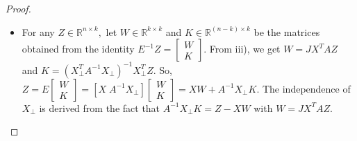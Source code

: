 \documentclass[10pt,a4paper]{amsart}
\def\Rbkk{{\mathbb{R}^{k\times k}}}
\def\Rbnk{{\mathbb{R}^{n\times k}}}
\begin{document}
\begin{proof}
\begin{itemize}
					\item[iv)] For any $Z\in\Rbnk,$ let $W\in\Rbkk$ and $K\in\mathbb{R}^{(n-k)\times k}$ be the matrices obtained from the identity $E^{-1}Z =  \left[\begin{smallmatrix}
						W\\ 
						K
					\end{smallmatrix}\right].$ From iii), we get $W = JX^{T}AZ$ and $ K = (X_{\perp}^{T}A^{-1}X_{\perp})^{-1}X_{\perp}^{T}Z.$ %
					So,
					$Z = E  \left[\begin{smallmatrix}
						W\\ 
						K
					\end{smallmatrix}\right] = [X\; A^{-1}X_{\perp}] \left[\begin{smallmatrix}
						W\\ 
						K
					\end{smallmatrix}\right] = XW +  A^{-1}X_{\perp}K.$ 
					The independence of $X_{\perp}$  %
						is derived from the fact %
						that $A^{-1}X_{\perp}K = Z - XW$ with $W = JX^TAZ$.
				\end{itemize}
			\end{proof}
\end{document}
